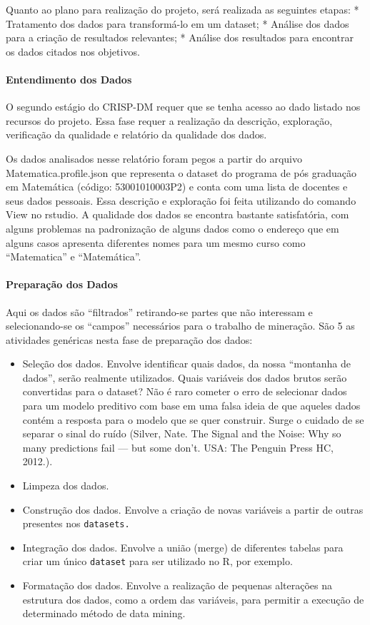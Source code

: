 \documentclass[]{article}
\providecommand{\tightlist}{%
  \setlength{\itemsep}{0pt}\setlength{\parskip}{0pt}}
\let\oldparagraph\paragraph
\renewcommand{\paragraph}[1]{\oldparagraph{#1}\mbox{}}
\begin{document}
Quanto ao plano para realização do projeto, será realizada as seguintes
etapas: * Tratamento dos dados para transformá-lo em um dataset; *
Análise dos dados para a criação de resultados relevantes; * Análise dos
resultados para encontrar os dados citados nos objetivos.

\paragraph{Entendimento dos Dados}\label{entendimento-dos-dados}

O segundo estágio do CRISP-DM requer que se tenha acesso ao dado listado
nos recursos do projeto. Essa fase requer a realização da descrição,
exploração, verificação da qualidade e relatório da qualidade dos dados.

Os dados analisados nesse relatório foram pegos a partir do arquivo
Matematica.profile.json que representa o dataset do programa de pós
graduação em Matemática (código: 53001010003P2) e conta com uma lista de
docentes e seus dados pessoais. Essa descrição e exploração foi feita
utilizando do comando View no rstudio. A qualidade dos dados se encontra
bastante satisfatória, com alguns problemas na padronização de alguns
dados como o endereço que em alguns casos apresenta diferentes nomes
para um mesmo curso como ``Matematica'' e ``Matemática''.

\paragraph{Preparação dos Dados}\label{preparacao-dos-dados}

Aqui os dados são ``filtrados'' retirando-se partes que não interessam e
selecionando-se os ``campos'' necessários para o trabalho de mineração.
São 5 as atividades genéricas nesta fase de preparação dos dados:

\begin{itemize}
\tightlist
\item
  Seleção dos dados. Envolve identificar quais dados, da nossa
  ``montanha de dados'', serão realmente utilizados. Quais variáveis dos
  dados brutos serão convertidas para o dataset? Não é raro cometer o
  erro de selecionar dados para um modelo preditivo com base em uma
  falsa ideia de que aqueles dados contém a resposta para o modelo que
  se quer construir. Surge o cuidado de se separar o sinal do ruído
  (Silver, Nate. The Signal and the Noise: Why so many predictions fail
  --- but some don't. USA: The Penguin Press HC, 2012.).
\item
  Limpeza dos dados.
\item
  Construção dos dados. Envolve a criação de novas variáveis a partir de
  outras presentes nos \texttt{datasets.}
\item
  Integração dos dados. Envolve a união (merge) de diferentes tabelas
  para criar um único \texttt{dataset} para ser utilizado no R, por
  exemplo.
\item
  Formatação dos dados. Envolve a realização de pequenas alterações na
  estrutura dos dados, como a ordem das variáveis, para permitir a
  execução de determinado método de data mining.
\end{itemize}
\end{document}
